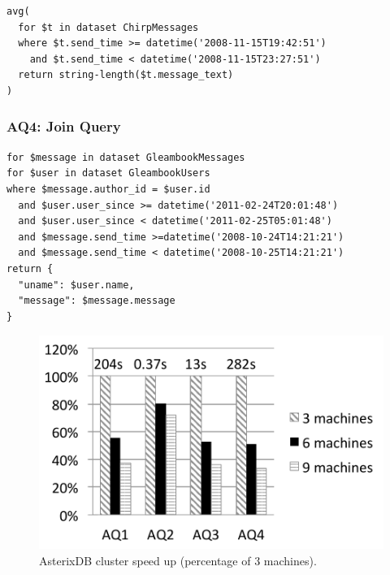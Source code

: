 \begin{lstlisting}
avg(
  for $t in dataset ChirpMessages
  where $t.send_time >= datetime('2008-11-15T19:42:51')  
    and $t.send_time < datetime('2008-11-15T23:27:51')  
  return string-length($t.message_text)
)
\end{lstlisting}



\subsubsection*{AQ4: Join Query}

\begin{lstlisting}
for $message in dataset GleambookMessages
for $user in dataset GleambookUsers
where $message.author_id = $user.id 
  and $user.user_since >= datetime('2011-02-24T20:01:48')
  and $user.user_since < datetime('2011-02-25T05:01:48')
  and $message.send_time >=datetime('2008-10-24T14:21:21')
  and $message.send_time < datetime('2008-10-25T14:21:21')
return {
  "uname": $user.name,
  "message": $message.message
}
\end{lstlisting}



\begin{figure}[tb]
\includegraphics[width=\columnfigurewidth]{images/asterix_speed_up}
\centering
\vspace{-2ex}
\caption{AsterixDB cluster speed up (percentage of 3 machines).}
\label{fig:asterixdb_speed_up}
\end{figure}

